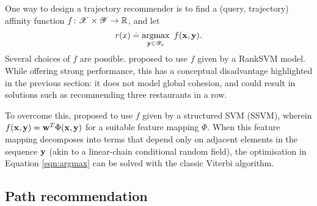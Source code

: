 One way to design a trajectory recommender is to find a (query, trajectory) affinity function $f \colon \mathscr{X} \times \mathscr{Y} \to \mathbb{R}$, and let
\begin{equation}
	\label{eqn:argmax}
	r( x ) \stackrel{.}{=} \operatorname*{argmax}_{\mathbf{y} \in \mathscr{Y}_x}~f(\mathbf{x}, \mathbf{y}).
\end{equation}
Several choices of $f$ are possible.
\citet{cikm16paper} proposed to use $f$ given by a RankSVM model. %
While offering strong performance, this has a conceptual disadvantage highlighted in the previous section:
it does not model global cohesion, and could result in solutions such as recommending three restaurants in a row.

To overcome this, \citet{Chen:2017} proposed to use $f$ given by a structured SVM (SSVM),
wherein $f( \mathbf{x}, \mathbf{y} ) = \mathbf{w}^T \Phi( \mathbf{x}, \mathbf{y} )$ for a suitable feature mapping $\Phi$.
When this feature mapping decomposes into terms that depend only on adjacent elements in the sequence $\mathbf{y}$ (akin to a linear-chain conditional random field),
the optimisation in Equation \ref{eqn:argmax} can be solved with the classic Viterbi algorithm.



%
\subsection{Path recommendation}

